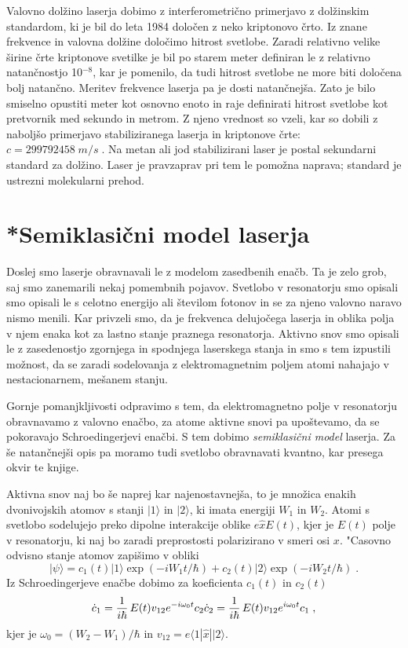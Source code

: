 Valovno dolžino laserja dobimo z interferometrično primerjavo z
dolžinskim standardom, ki je bil do leta 1984 določen z neko kriptonovo
črto. Iz znane frekvence in valovna dolžine določimo hitrost svetlobe.
Zaradi relativno velike širine črte kriptonove svetilke je bil po starem
meter definiran le z relativno natančnostjo 10$^{- 8}$, kar je pomenilo, da
tudi hitrost svetlobe ne more biti določena bolj natančno. Meritev
frekvence laserja pa je dosti natančnejša. Zato je bilo smiselno opustiti
meter kot osnovno enoto in raje definirati hitrost svetlobe kot pretvornik
med sekundo in metrom. Z njeno vrednost so vzeli, kar so dobili z naboljšo
primerjavo stabiliziranega laserja in kriptonove črte: $c=299 792
458\;m/s\;. $ Na metan ali jod stabilizirani laser je postal sekundarni
standard za dolžino. Laser je pravzaprav pri tem le pomožna naprava;
standard je ustrezni molekularni prehod.

\section{*Semiklasični model laserja}
\label{chap:semiklasicni}
Doslej smo laserje obravnavali le z modelom zasedbenih enačb. Ta je zelo
grob, saj smo zanemarili nekaj pomembnih pojavov. Svetlobo v resonatorju smo
opisali smo opisali le s celotno energijo ali številom fotonov in se za
njeno valovno naravo nismo menili. Kar privzeli smo, da je frekvenca
delujočega laserja in oblika polja v njem enaka kot za lastno stanje
praznega resonatorja. Aktivno snov smo opisali le z zasedenostjo zgornjega
in spodnjega laserskega stanja in smo s tem izpustili možnost, da se zaradi
sodelovanja z elektromagnetnim poljem atomi nahajajo v nestacionarnem,
mešanem stanju.

Gornje pomanjkljivosti odpravimo s tem, da elektromagnetno polje v
resonatorju obravnavamo z valovno enačbo, za atome aktivne snovi pa
upoštevamo, da se pokoravajo Schroedingerjevi enačbi. S tem dobimo {\it %
semiklasični model} laserja. Za še natančnejši opis pa moramo tudi
svetlobo obravnavati kvantno, kar presega okvir te knjige.

Aktivna snov naj bo še naprej kar najenostavnejša, to je množica enakih
dvonivojskih atomov s stanji $|1\rangle$ in $|2\rangle$, ki imata energiji $%
W_1$ in $W_2$. Atomi s svetlobo sodelujejo preko dipolne interakcije oblike $%
e\hat{x}E(t)$, kjer je $E(t)$ polje v resonatorju, ki naj bo zaradi
preprostosti polarizirano v smeri osi $x$. "Casovno odvisno stanje atomov
zapišimo v obliki 
\begin{equation}  \label{5.45}
|\psi\rangle=c_1(t)|1\rangle\exp(-iW_1t/\hbar)+
c_2(t)|2\rangle\exp(-iW_2t/\hbar)\;.
\end{equation}
Iz Schroedingerjeve enačbe dobimo za koeficienta $c_1(t)$ in $c_2(t)$ 
\begin{equation}  \label{5.46}
\dot{c}_1=\frac{1}{i\hbar}\,E(t)v_{12}e^{-i\omega_0 t}c_2 \dot{c}_2=\frac{1}{%
i\hbar}\,E(t)v_{12}e^{i\omega_0 t}c_1\;,
\end{equation}
kjer je $\omega_0=(W_2-W_1)/\hbar$ in $v_{12}=e\langle 1|\hat{x}||2\rangle$.

